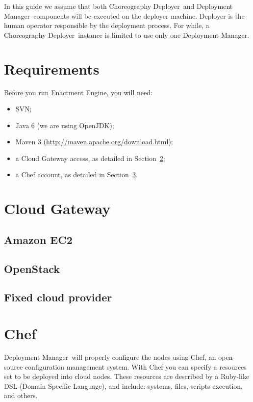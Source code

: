 \documentclass[a4paper, 10pt]{article}
\newcommand{\ee}{Enactment Engine}
\newcommand{\cd}{Choreography Deployer}
\newcommand{\dm}{Deployment Manager}
\begin{document}
In this guide we assume that both \cd\ and \dm\ components will be executed on the deployer machine. Deployer is the human operator responsible by the deployment process. For while, a \cd\ instance is limited to use only one \dm.

\section{Requirements}

Before you run \ee, you will need:

\begin{itemize}
\item SVN;
\item Java 6 (we are using OpenJDK);
\item Maven 3  (\url{http://maven.apache.org/download.html});
\item a Cloud Gateway access, as detailed in Section~\ref{sec:cloud};
\item a Chef account, as detailed in Section~\ref{sec:chef}.
\end{itemize}

\section{Cloud Gateway}
\label{sec:cloud}

\subsection{Amazon EC2}

\subsection{OpenStack}

\subsection{Fixed cloud provider}

\section{Chef}
\label{sec:chef}

\dm\ will properly configure the nodes using Chef, an open-source configuration management system. With Chef you can specify a resources set to be deployed into cloud nodes. These resources are described by a Ruby-like DSL (Domain Specific Language), and include: systems, files, scripts execution, and others.
\end{document}
